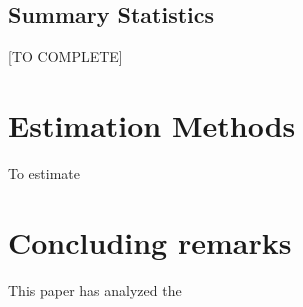 \documentclass[12pt]{article}
\begin{document}
\begin{itemize}
\begin{enumerate}
		\end{enumerate}
		
	\end{itemize}
	



\subsection{Summary Statistics}


[TO COMPLETE]




\section{Estimation Methods} \label{estimation_methods}

To estimate 

\newpage
\section{Concluding remarks} \label{conclusions}

This paper has analyzed the 


\newpage





%






\newpage
























\appendix
\renewcommand{\thefigure}{A\arabic{figure}}
\renewcommand{\thetable}{A\arabic{table}}
\renewcommand{\theequation}{A\arabic{equation}}

\setcounter{figure}{0}
\setcounter{table}{0}

%
\end{document}
